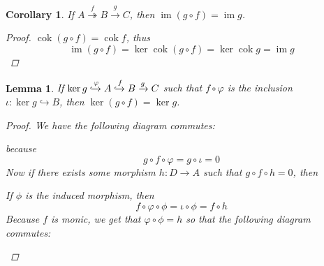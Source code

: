 \documentclass{article}
\DeclareMathOperator{\im}{im}
\DeclareMathOperator{\cok}{cok}
\newtheorem{corollary}{Corollary}[theorem]
\newtheorem{lemma}[theorem]{Lemma}
\begin{document}
    \begin{corollary}\label{cor:comp with epic and im}
    If $A\overset{f}\twoheadrightarrow B \xrightarrow{g} C$, then $\im (g\circ f)=\im g$.
    \begin{proof}
        $\cok (g\circ f)=\cok f$, thus
        \[
        \im (g\circ f)=\ker \cok (g\circ f)=\ker \cok g=\im g
        \]
    \end{proof}
\end{corollary}
\begin{lemma}\label{lem:double comp with monic and ker}
    If $\ker g \xhookrightarrow{\varphi} A\xhookrightarrow{f}B \xrightarrow[]{g}C$ such that $f\circ \varphi$ is the inclusion\\  $\iota:\ker g\hookrightarrow B$, then $\ker (g\circ f)=\ker g$.
    \begin{proof}
        We have the following diagram commutes:
        \begin{center}
        \end{center}
        because
        \[
        g\circ f\circ \varphi=g\circ \iota=0
        \]
        Now if there exists some morphism $h:D\to A$ such that $g\circ f \circ h=0$, then
        \begin{center}
        \end{center}
        If $\phi$ is the induced morphism, then 
        \[
        f\circ \varphi\circ \phi=\iota\circ \phi=f\circ h
        \]
        Because $f$ is monic, we get that $\varphi \circ \phi=h$ so that the following diagram commutes:
        \begin{center}
        \end{center}
    \end{proof}
\end{lemma}
\end{document}
